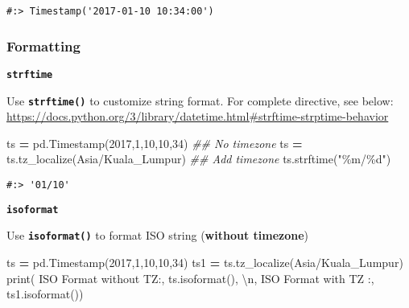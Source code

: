\documentclass[
]{book}
\newenvironment{Shaded}{\begin{snugshade}}{\end{snugshade}}
\newcommand{\BuiltInTok}[1]{#1}
\newcommand{\CharTok}[1]{\textcolor[rgb]{0.5,0.5,0.5}{#1}}
\newcommand{\CommentTok}[1]{\textcolor[rgb]{0.37,0.37,0.37}{\textit{#1}}}
\newcommand{\DecValTok}[1]{\textcolor[rgb]{0.06,0.06,0.06}{#1}}
\newcommand{\NormalTok}[1]{#1}
\newcommand{\OperatorTok}[1]{\textcolor[rgb]{0.43,0.43,0.43}{\textbf{#1}}}
\newcommand{\SpecialCharTok}[1]{\textcolor[rgb]{0,0,0}{#1}}
\newcommand{\StringTok}[1]{\textcolor[rgb]{0.5,0.5,0.5}{#1}}
\begin{document}
\begin{verbatim}
#:> Timestamp('2017-01-10 10:34:00')
\end{verbatim}

\hypertarget{formatting}{%
\subsubsection{Formatting}\label{formatting}}

\textbf{\texttt{strftime}}

Use \textbf{\texttt{strftime()}} to customize string format. For complete directive, see below: \url{https://docs.python.org/3/library/datetime.html\#strftime-strptime-behavior}

\begin{Shaded}
\begin{Highlighting}[]
\NormalTok{ts }\OperatorTok{=}\NormalTok{ pd.Timestamp(}\DecValTok{2017}\NormalTok{,}\DecValTok{1}\NormalTok{,}\DecValTok{10}\NormalTok{,}\DecValTok{10}\NormalTok{,}\DecValTok{34}\NormalTok{)        }\CommentTok{\#\# No timezone}
\NormalTok{ts }\OperatorTok{=}\NormalTok{ ts.tz\_localize(}\StringTok{\textquotesingle{}Asia/Kuala\_Lumpur\textquotesingle{}}\NormalTok{)  }\CommentTok{\#\# Add timezone}
\NormalTok{ts.strftime(}\StringTok{"\%m/}\SpecialCharTok{\%d}\StringTok{"}\NormalTok{)}
\end{Highlighting}
\end{Shaded}

\begin{verbatim}
#:> '01/10'
\end{verbatim}

\textbf{\texttt{isoformat}}

Use \textbf{\texttt{isoformat()}} to format ISO string (\textbf{without timezone})

\begin{Shaded}
\begin{Highlighting}[]
\NormalTok{ts }\OperatorTok{=}\NormalTok{ pd.Timestamp(}\DecValTok{2017}\NormalTok{,}\DecValTok{1}\NormalTok{,}\DecValTok{10}\NormalTok{,}\DecValTok{10}\NormalTok{,}\DecValTok{34}\NormalTok{)        }
\NormalTok{ts1 }\OperatorTok{=}\NormalTok{ ts.tz\_localize(}\StringTok{\textquotesingle{}Asia/Kuala\_Lumpur\textquotesingle{}}\NormalTok{) }
\BuiltInTok{print}\NormalTok{( }\StringTok{\textquotesingle{} ISO Format without TZ:\textquotesingle{}}\NormalTok{, ts.isoformat(), }\StringTok{\textquotesingle{}}\CharTok{\textbackslash{}n}\StringTok{\textquotesingle{}}\NormalTok{,}
       \StringTok{\textquotesingle{}ISO Format with TZ   :\textquotesingle{}}\NormalTok{, ts1.isoformat())}
\end{Highlighting}
\end{Shaded}
\end{document}

